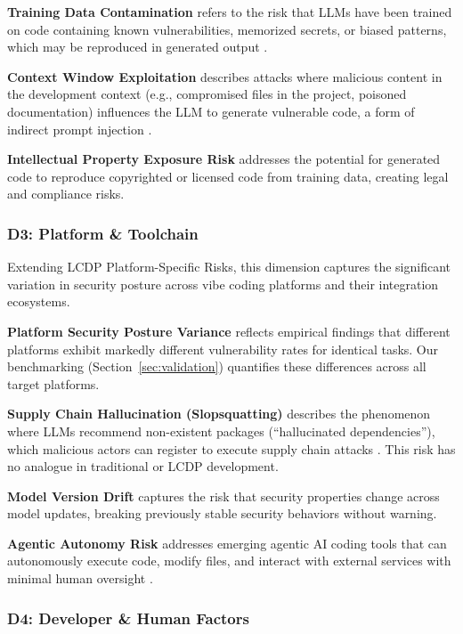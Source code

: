 \documentclass[preprint,review,12pt]{elsarticle}
\begin{document}
\textbf{Training Data Contamination} refers to the risk that LLMs have been trained on code containing known vulnerabilities, memorized secrets, or biased patterns, which may be reproduced in generated output \cite{jesse2023large}.

\textbf{Context Window Exploitation} describes attacks where malicious content in the development context (e.g., compromised files in the project, poisoned documentation) influences the LLM to generate vulnerable code, a form of indirect prompt injection \cite{greshake2023not, wu2024new}.

\textbf{Intellectual Property Exposure Risk} addresses the potential for generated code to reproduce copyrighted or licensed code from training data, creating legal and compliance risks.


\subsubsection{D3: Platform \& Toolchain}
\label{subsubsec:d3}

Extending LCDP Platform-Specific Risks, this dimension captures the significant variation in security posture across vibe coding platforms and their integration ecosystems.

\textbf{Platform Security Posture Variance} reflects empirical findings that different platforms exhibit markedly different vulnerability rates for identical tasks. Our benchmarking (Section~\ref{sec:validation}) quantifies these differences across all target platforms.

\textbf{Supply Chain Hallucination (Slopsquatting)} describes the phenomenon where LLMs recommend non-existent packages (``hallucinated dependencies''), which malicious actors can register to execute supply chain attacks \cite{lanyado2023can, thompson2024slopsquatting, spracklen2024we}. This risk has no analogue in traditional or LCDP development.

\textbf{Model Version Drift} captures the risk that security properties change across model updates, breaking previously stable security behaviors without warning.

\textbf{Agentic Autonomy Risk} addresses emerging agentic AI coding tools that can autonomously execute code, modify files, and interact with external services with minimal human oversight \cite{chan2024harms}.


\subsubsection{D4: Developer \& Human Factors}
\label{subsubsec:d4}
\end{document}
